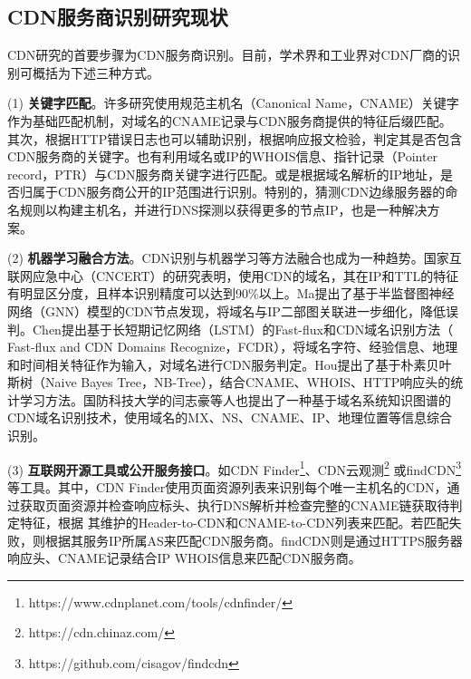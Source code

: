 
\subsection{CDN服务商识别研究现状}

CDN研究的首要步骤为CDN服务商识别。目前，学术界和工业界对CDN厂商的识别可概括为下述三种方式。
 
(1) \textbf{关键字匹配}。许多研究\cite{Huang2008,Adhikari2014,Guo2018}使用规范主机名（Canonical Name，CNAME）关键字作为基础匹配机制，对域名的CNAME记录与CDN服务商提供的特征后缀匹配。其次，根据HTTP错误日志\cite{Huang2008,Guo2018}也可以辅助识别，根据响应报文检验，判定其是否包含CDN服务商的关键字。也有利用域名或IP的WHOIS\cite{Adhikari2014}信息、指针记录\cite{Chen2019}（Pointer record，PTR）与CDN服务商关键字进行匹配。或是根据域名解析的IP地址，是否归属于CDN服务商公开的IP范围进行识别\cite{Choffnes2017}。特别的，猜测CDN边缘服务器的命名规则以构建主机名，并进行DNS探测以获得更多的节点IP\cite{Hohlfeld2018,Timm2018}，也是一种解决方案。

(2) \textbf{机器学习融合方法}。CDN识别与机器学习等方法融合也成为一种趋势。国家互联网应急中心\cite{Li2020}（CNCERT）的研究表明，使用CDN的域名，其在IP和TTL的特征有明显区分度，且样本识别精度可以达到90\%以上。Ma\cite{Ma2021}提出了基于半监督图神经网络（GNN）模型的CDN节点发现，将域名与IP二部图关联进一步细化，降低误判。Chen\cite{Chen2019}提出基于长短期记忆网络（LSTM）的Fast-flux和CDN域名识别方法（  Fast-flux  and  CDN  Domains  Recognize，FCDR），将域名字符、经验信息、地理和时间相关特征作为输入，对域名进行CDN服务判定。Hou\cite{Hou2021}提出了基于朴素贝叶斯树（Naive Bayes Tree，NB-Tree）\cite{Liang2006}，结合CNAME、WHOIS、HTTP响应头的统计学习方法\cite{Hou2021}。国防科技大学的闫志豪\cite{yan-2022}等人也提出了一种基于域名系统知识图谱的CDN域名识别技术，使用域名的MX、NS、CNAME、IP、地理位置等信息综合识别。 

(3) \textbf{互联网开源工具或公开服务接口}。如CDN Finder\footnote{https://www.cdnplanet.com/tools/cdnfinder/}、CDN云观测\footnote{https://cdn.chinaz.com/}
或findCDN\footnote{https://github.com/cisagov/findcdn}等工具。其中，CDN Finder使用页面资源列表来识别每个唯一主机名的CDN，通过获取页面资源并检查响应标头、执行DNS解析并检查完整的CNAME链获取待判定特征，根据
其维护的Header-to-CDN和CNAME-to-CDN列表来匹配。若匹配失败，则根据其服务IP所属AS来匹配CDN服务商。findCDN则是通过HTTPS服务器响应头、CNAME记录结合IP WHOIS信息来匹配CDN服务商。 


